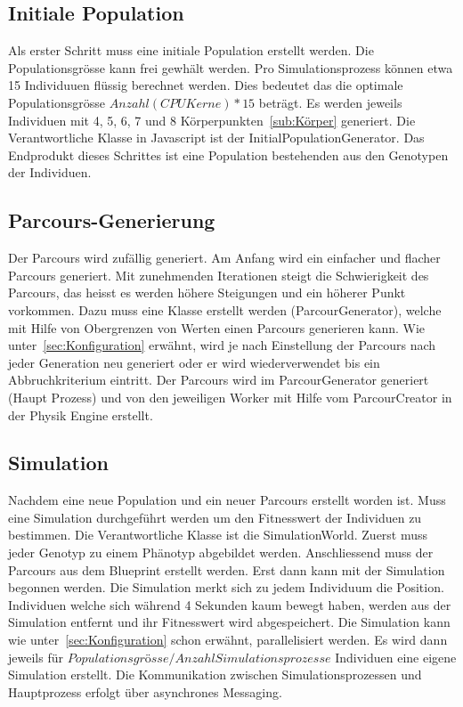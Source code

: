     \subsection{Initiale Population\label{sec:Initiale Polulation}}

      Als erster Schritt muss eine initiale Population erstellt werden. Die Populationsgrösse kann frei gewhält werden.
      Pro Simulationsprozess können etwa 15 Individuuen flüssig berechnet werden.
      Dies bedeutet das die optimale Populationsgrösse  \( Anzahl(CPU Kerne) * 15 \) beträgt.
      Es werden jeweils Individuen mit 4, 5, 6, 7 und 8 Körperpunkten~\ref{sub:Körper} generiert.
      Die Verantwortliche Klasse in Javascript ist der InitialPopulationGenerator.
      Das Endprodukt dieses Schrittes ist eine Population bestehenden aus den Genotypen der Individuen.

    \subsection{Parcours-Generierung\label{sec:Parcour Generierung}}

      Der Parcours wird zufällig generiert. Am Anfang wird ein einfacher und flacher Parcours generiert.
      Mit zunehmenden Iterationen steigt die Schwierigkeit des Parcours,
      das heisst es werden höhere Steigungen und ein höherer Punkt vorkommen.
      Dazu muss eine Klasse erstellt werden (ParcourGenerator),
      welche mit Hilfe von Obergrenzen von Werten einen Parcours generieren kann.
      Wie unter~\ref{sec:Konfiguration} erwähnt,
      wird je nach Einstellung der Parcours nach jeder Generation neu generiert oder er wird wiederverwendet
      bis ein Abbruchkriterium eintritt.
      Der Parcours wird im ParcourGenerator generiert (Haupt Prozess) und
      von den jeweiligen Worker mit Hilfe vom ParcourCreator in der Physik Engine erstellt.

    \subsection{Simulation}

      Nachdem eine neue Population und ein neuer Parcours erstellt worden ist.
      Muss eine Simulation durchgeführt werden um den Fitnesswert der Individuen zu bestimmen.
      Die Verantwortliche Klasse ist die SimulationWorld.
      Zuerst muss jeder Genotyp zu einem Phänotyp abgebildet werden.
      Anschliessend muss der Parcours aus dem Blueprint erstellt werden.
      Erst dann kann mit der Simulation begonnen werden.
      Die Simulation merkt sich zu jedem Individuum die Position.
      Individuen welche sich während 4 Sekunden kaum bewegt haben,
      werden aus der Simulation entfernt und ihr Fitnesswert wird abgespeichert.
      Die Simulation kann wie unter~\ref{sec:Konfiguration} schon erwähnt, parallelisiert werden.
      Es wird dann jeweils für \( Populationsgrösse / Anzahl Simulationsprozesse \) Individuen eine eigene Simulation erstellt.
      Die Kommunikation zwischen Simulationsprozessen und Hauptprozess erfolgt über asynchrones Messaging.

